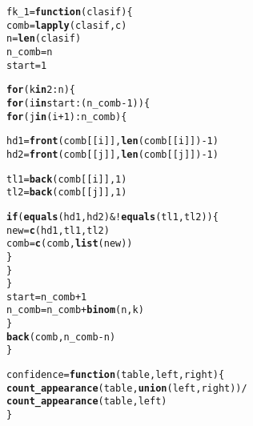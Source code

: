 \documentclass[12pt]{report}\usepackage[]{graphicx}\usepackage[dvipsnames]{xcolor}
\makeatletter
\newcommand{\hlnum}[1]{\textcolor[rgb]{0.686,0.059,0.569}{#1}}%
\newcommand{\hlopt}[1]{\textcolor[rgb]{0,0,0}{#1}}%
\newcommand{\hlstd}[1]{\textcolor[rgb]{0.345,0.345,0.345}{#1}}%
\newcommand{\hlkwa}[1]{\textcolor[rgb]{0.161,0.373,0.58}{\textbf{#1}}}%
\newcommand{\hlkwb}[1]{\textcolor[rgb]{0.69,0.353,0.396}{#1}}%
\newcommand{\hlkwc}[1]{\textcolor[rgb]{0.333,0.667,0.333}{#1}}%
\newcommand{\hlkwd}[1]{\textcolor[rgb]{0.737,0.353,0.396}{\textbf{#1}}}%
\newenvironment{kframe}{%
 \def\at@end@of@kframe{}%
 \ifinner\ifhmode%
  \def\at@end@of@kframe{\end{minipage}}%
  \begin{minipage}{\columnwidth}%
 \fi\fi%
 \def\FrameCommand##1{\hskip\@totalleftmargin \hskip-\fboxsep
 \colorbox{shadecolor}{##1}\hskip-\fboxsep
     \hskip-\linewidth \hskip-\@totalleftmargin \hskip\columnwidth}%
 \MakeFramed {\advance\hsize-\width
   \@totalleftmargin\z@ \linewidth\hsize
   \@setminipage}}%
 {\par\unskip\endMakeFramed%
 \at@end@of@kframe}
\newenvironment{knitrout}{}{} %
\makeatother
\begin{document}
\begin{knitrout}
\color{fgcolor}\begin{kframe}
\begin{alltt}
\hlstd{fk_1} \hlkwb{=} \hlkwa{function}\hlstd{(}\hlkwc{clasif}\hlstd{) \{}
        \hlstd{comb} \hlkwb{=} \hlkwd{lapply}\hlstd{(clasif, c)}
        \hlstd{n} \hlkwb{=} \hlkwd{len}\hlstd{(clasif)}
        \hlstd{n_comb} \hlkwb{=} \hlstd{n}
        \hlstd{start} \hlkwb{=} \hlnum{1}

        \hlkwa{for} \hlstd{(k} \hlkwa{in} \hlnum{2}\hlopt{:}\hlstd{n) \{}
                \hlkwa{for} \hlstd{(i} \hlkwa{in} \hlstd{start}\hlopt{:}\hlstd{(n_comb}\hlopt{-}\hlnum{1}\hlstd{)) \{}
                        \hlkwa{for} \hlstd{(j} \hlkwa{in} \hlstd{(i}\hlopt{+}\hlnum{1}\hlstd{)}\hlopt{:}\hlstd{n_comb) \{}

                                \hlstd{hd1} \hlkwb{=} \hlkwd{front}\hlstd{(comb[[i]],} \hlkwd{len}\hlstd{(comb[[i]])}\hlopt{-}\hlnum{1}\hlstd{)}
                                \hlstd{hd2} \hlkwb{=} \hlkwd{front}\hlstd{(comb[[j]],} \hlkwd{len}\hlstd{(comb[[j]])}\hlopt{-}\hlnum{1}\hlstd{)}

                                \hlstd{tl1} \hlkwb{=} \hlkwd{back}\hlstd{(comb[[i]],} \hlnum{1}\hlstd{)}
                                \hlstd{tl2} \hlkwb{=} \hlkwd{back}\hlstd{(comb[[j]],} \hlnum{1}\hlstd{)}

                                \hlkwa{if} \hlstd{(}\hlkwd{equals}\hlstd{(hd1, hd2)} \hlopt{& !}\hlkwd{equals}\hlstd{(tl1, tl2)) \{}
                                        \hlstd{new} \hlkwb{=} \hlkwd{c}\hlstd{(hd1, tl1, tl2)}
                                        \hlstd{comb} \hlkwb{=} \hlkwd{c}\hlstd{(comb,} \hlkwd{list}\hlstd{(new))}
                                \hlstd{\}}
                        \hlstd{\}}
                \hlstd{\}}
                \hlstd{start} \hlkwb{=} \hlstd{n_comb} \hlopt{+} \hlnum{1}
                \hlstd{n_comb} \hlkwb{=} \hlstd{n_comb} \hlopt{+} \hlkwd{binom}\hlstd{(n, k)}
        \hlstd{\}}
        \hlkwd{back}\hlstd{(comb, n_comb}\hlopt{-}\hlstd{n)}
\hlstd{\}}

\hlstd{confidence} \hlkwb{=} \hlkwa{function}\hlstd{(}\hlkwc{table}\hlstd{,} \hlkwc{left}\hlstd{,} \hlkwc{right}\hlstd{) \{}
        \hlkwd{count_appearance}\hlstd{(table,} \hlkwd{union}\hlstd{(left, right))} \hlopt{/}
                \hlkwd{count_appearance}\hlstd{(table, left)}
\hlstd{\}}
\end{alltt}
\end{kframe}
\end{knitrout}
			
\end{document}
